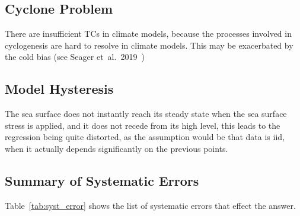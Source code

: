 \subsection{Cyclone Problem}
There are insufficient TCs in climate models, because the processes involved
in cyclogenesis are hard to resolve in climate models. This may be
exacerbated by the cold bias (see Seager et~al.~2019~\cite{seager2019strengthening})

\subsection{Model Hysteresis}
The sea surface does not instantly reach its steady state when the sea surface
stress is applied, and it does not recede from its high level, this leads
to the regression being quite distorted, as the assumption would be that data
is iid, when it actually depends significantly on the previous points.


\subsection{Summary of Systematic Errors}
\label{sec:sys-errors}
Table~\ref{tab:syst_error} shows the list of systematic errors that effect the
answer.


